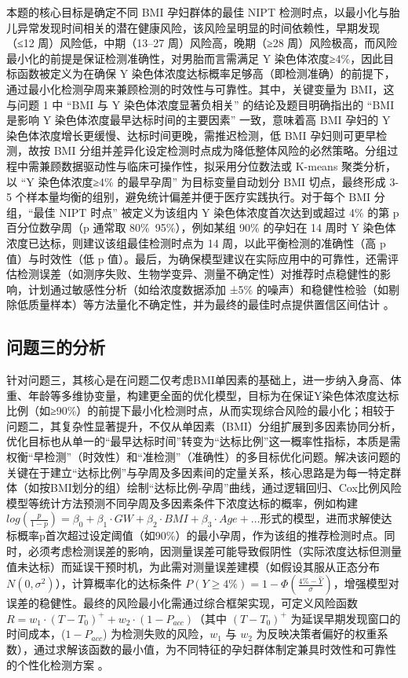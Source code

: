 \documentclass[withoutpreface,bwprint]{cumcmthesis} %
\begin{document}
本题的核心目标是确定不同 BMI 孕妇群体的最佳 NIPT 检测时点，以最小化与胎儿异常发现时间相关的潜在健康风险，该风险呈明显的时间依赖性，早期发现（≤12 周）风险低，中期（13–27 周）风险高，晚期（≥28 周）风险极高，而风险最小化的前提是保证检测准确性，对男胎而言需满足 Y 染色体浓度≥4\%，因此目标函数被定义为在确保 Y 染色体浓度达标概率足够高（即检测准确）的前提下，通过最小化检测孕周来兼顾检测的时效性与可靠性。其中，关键变量为 BMI，这与问题 1 中 “BMI 与 Y 染色体浓度显著负相关” 的结论及题目明确指出的 “BMI 是影响 Y 染色体浓度最早达标时间的主要因素” 一致，意味着高 BMI 孕妇的 Y 染色体浓度增长更缓慢、达标时间更晚，需推迟检测，低 BMI 孕妇则可更早检测，故按 BMI 分组并差异化设定检测时点成为降低整体风险的必然策略。分组过程中需兼顾数据驱动性与临床可操作性，拟采用分位数法或 K-means 聚类分析，以 “Y 染色体浓度≥4\% 的最早孕周” 为目标变量自动划分 BMI 切点，最终形成 3-5 个样本量均衡的组别，避免统计偏差并便于医疗实践执行。对于每个 BMI 分组，“最佳 NIPT 时点” 被定义为该组内 Y 染色体浓度首次达到或超过 4\% 的第 p 百分位数孕周（p 通常取 80\%~95\%），例如某组 90\% 的孕妇在 14 周时 Y 染色体浓度已达标，则建议该组最佳检测时点为 14 周，以此平衡检测的准确性（高 p 值）与时效性（低 p 值）。最后，为确保模型建议在实际应用中的可靠性，还需评估检测误差（如测序失败、生物学变异、测量不确定性）对推荐时点稳健性的影响，计划通过敏感性分析（如给浓度数据添加 ±5\% 的噪声）和稳健性检验（如剔除低质量样本）等方法量化不确定性，并为最终的最佳时点提供置信区间估计 。


\subsection{问题三的分析}

针对问题三，其核心是在问题二仅考虑BMI单因素的基础上，进一步纳入身高、体重、年龄等多维协变量，构建更全面的优化模型，目标为在保证Y染色体浓度达标比例（如≥90\%）的前提下最小化检测时点，从而实现综合风险的最小化；相较于问题二，其复杂性显著提升，不仅从单因素（BMI）分组扩展到多因素协同分析，优化目标也从单一的“最早达标时间”转变为“达标比例”这一概率性指标，本质是需权衡“早检测”（时效性）和“准检测”（准确性）的多目标优化问题。解决该问题的关键在于建立“达标比例”与孕周及多因素间的定量关系，核心思路是为每一特定群体（如按BMI划分的组）绘制“达标比例-孕周”曲线，通过逻辑回归、Cox比例风险模型等统计方法预测不同孕周及多因素条件下浓度达标的概率，例如构建 $log(\frac{p}{1-p}) = \beta_0 + \beta_1 \cdot GW + \beta_2 \cdot BMI + \beta_3 \cdot Age + \ldots$形式的模型，进而求解使达标概率p首次超过设定阈值（如90\%）的最小孕周，作为该组的推荐检测时点。同时，必须考虑检测误差的影响，因测量误差可能导致假阴性（实际浓度达标但测量值未达标）而延误干预时机，为此需对测量误差建模（如假设其服从正态分布 $N(0, \sigma^2)$），计算概率化的达标条件 $P(Y \geq 4\%) = 1 - \Phi(\frac{4\% - \hat{Y}}{\sigma})$，增强模型对误差的稳健性。最终的风险最小化需通过综合框架实现，可定义风险函数 $R = w_1 \cdot (T - T_0)^+ + w_2 \cdot (1 - P_{acc})$（其中 $(T - T_0)^+$ 为延误早期发现窗口的时间成本，($1 - P_{acc}$) 为检测失败的风险，$w_1$ 与 $w_2$ 为反映决策者偏好的权重系数），通过求解该函数的最小值，为不同特征的孕妇群体制定兼具时效性和可靠性的个性化检测方案 。
\end{document}
